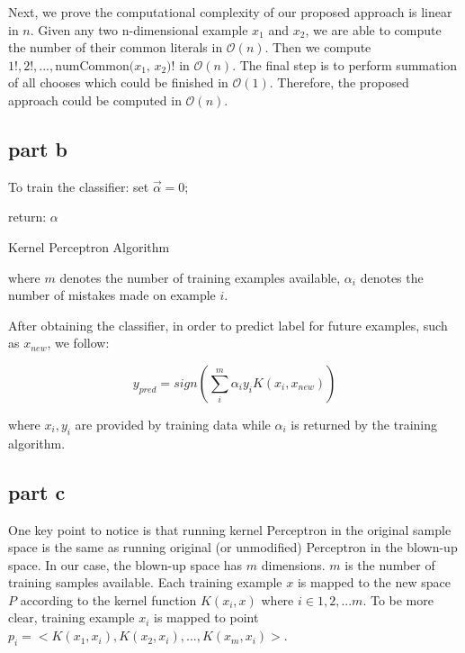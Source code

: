 Next, we prove the computational complexity of our proposed approach is linear in $n$. Given any two n-dimensional example $x_1$ and $x_2$, we are able to compute the number of their common literals in $\mathcal{O}(n)$. Then we compute $1!, 2!, ..., \text{numCommon($x_1$, $x_2$)}!$ in $\mathcal{O}(n)$. The final step is to perform summation of all chooses which could be finished in $\mathcal{O}(1)$. Therefore, the proposed approach could be computed in $\mathcal{O}(n)$.


\subsection{part b}
\begin{algorithm}[H]
To train the classifier:
  set $\vec{\alpha}=0$;



return: $\alpha$\;

 \caption{Kernel Perceptron Algorithm}
\end{algorithm}

where $m$ denotes the number of training examples available, $\alpha_i$ denotes the number of mistakes made on example $i$.

After obtaining the classifier, in order to predict label for future examples, such as $x_{new}$, we follow:

\begin{equation}
y_{pred} = sign(\sum_{i}^{m} \alpha_i y_i K(x_i, x_{new}))
\end{equation}

where $x_i, y_i$ are provided by training data while $\alpha_i$ is returned by the training algorithm.

\subsection{part c}

One key point to notice is that running kernel Perceptron in the original sample space is the same as running original (or unmodified) Perceptron in the blown-up space. In our case, the blown-up space has $m$ dimensions. $m$ is the number of training samples available. Each training example $x$ is mapped to the new space $P$ according to the kernel function $K(x_i,x)$ where $i \in 1,2,...m$. To be more clear, training example $x_i$ is mapped to point $p_i = <K(x_1,x_i), K(x_2,x_i), ..., K(x_m, x_i)>$.

